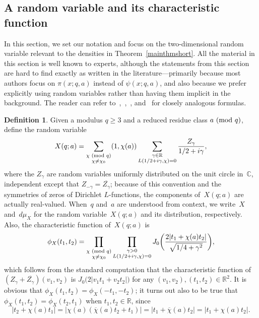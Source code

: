 \documentclass[11pt]{article}
\theoremstyle{plain}
\theoremstyle{definition}
\newtheorem{definition}[thm]{Definition}
\numberwithin{equation}{section}
\renewcommand{\mod}[1]{{\ifmmode\text{\rm\ (mod~$#1$)}\else\discretionary{}{}{\hbox{\!\!}}\rm(mod~$#1$)\fi}}
\renewcommand{\bar}{\overline}
\newcommand{\R}{\mathbb R}
\newcommand{\C}{\mathbb C}
\newcommand{\Xva}{X}
\newcommand{\0}{{\vec 0}}
\begin{document}
\subsection{A random variable and its characteristic function}

In this section, we set our notation and focus on the two-dimensional random variable relevant to the densities in Theorem~\ref{mainthmshort}. All the material in this section is well known to experts, although the statements from this section are hard to find exactly as written in the literature---primarily because most authors focus on $\pi(x;q,a)$ instead of $\psi(x;q,a)$, and also because we prefer explicitly using random variables rather than having them implicit in the background. The reader can refer to~\cite[Section~1]{ANS},~\cite[Section~2.1]{ISRPNR},~\cite[Section~12.1]{MV}, and~\cite[Section~2.1]{RS94} for closely analogous formulas.

\begin{definition} \label{X def}
Given a modulus $q\ge3$ and a reduced residue class $a\mod q$, define the random variable
\[
\Xva(q;a) = \sum_{\substack{\chi\mod{q}\\\chi\neq\chi_0}} (1,\chi(a)) \sum_{\substack{\gamma\in\R \\ L(1/2+i\gamma,\chi)=0}}\frac{Z_\gamma}{1/2+i\gamma},
\]
where the $Z_\gamma$ are random variables uniformly distributed on the unit circle in~$\C$, independent except that $Z_{-\gamma}=\bar{Z_{\gamma}}$; because of this convention and the symmetries of zeros of Dirichlet $L$-functions, the components of~$X(q;a)$ are actually real-valued. When~$q$ and~$a$ are understood from context, we write~$X$ and~$d\mu_X$ for the random variable~$X(q;a)$ and its distribution, respectively. Also, the characteristic function of~$X(q;a)$ is
\begin{equation} \label{characteristicfunctionX}
\phi_X(t_1,t_2) = \prod_{\substack{\chi\mod{q}\\ \chi\neq \chi_0}} \prod_{\substack{\gamma>0\\ L(1/2+i\gamma,\chi)=0}} J_0\biggl( \frac{2|t_1+\chi(a)t_2|}{\sqrt{1/4+\gamma^2}} \biggr),
\end{equation}
which follows from the standard computation that the characteristic function of $(Z_\gamma+\overline{Z_\gamma})(v_1,v_2)$ is $J_0\bigl( 2|v_1t_1+v_2t_2| \bigr)$ for any $(v_1,v_2),(t_1,t_2)\in\R^2$. It is obvious that $\phi_X(t_1,t_2)=\phi_X(-t_1,-t_2)$; it turns out also to be true that $\phi_X(t_1,t_2)=\phi_X(t_2,t_1)$ when $t_1,t_2\in\R$, since
\[
|t_2+\chi(a)t_1| = \bigl| \chi(a)(\bar\chi(a)t_2+t_1) \bigr| = |t_1+\bar\chi(a)t_2| = |t_1+\chi(a)t_2|.
\]
\end{definition}
\end{document}
